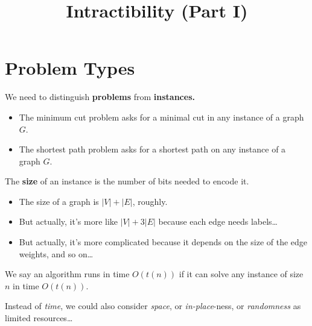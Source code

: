\title{Intractibility (Part I)}



\section{Problem Types}

We need to distinguish \textbf{problems} from \textbf{instances.}
\begin{itemize}
    \item The minimum cut problem asks for a minimal cut in any instance of a graph $G$.
    \item The shortest path problem asks for a shortest path on any instance of a graph $G$.
\end{itemize}
The \textbf{size} of an instance is the number of bits needed to encode it.
\begin{itemize}
    \item The size of a graph is $|V| + |E|$, roughly.
    \item But actually, it's more like $|V| + 3|E|$ because each edge needs labels\dots
    \item But actually, it's more complicated because it depends on the size of the edge weights, and so on\dots
\end{itemize}
We say an algorithm runs in time $O(t(n))$ if it can solve any instance of size $n$ in time $O(t(n))$.

\begin{remark}
    Instead of \emph{time}, we could also consider \emph{space}, or \emph{in-place}-ness, or \emph{randomness} as limited resources\dots
\end{remark}

